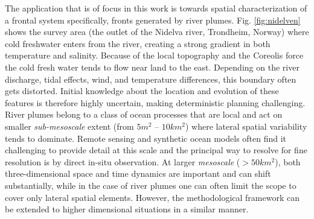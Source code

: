 \documentclass[aoas]{imsart}
\begin{document}
The application that is of focus in this work is towards spatial characterization of a frontal system specifically, fronts generated by river
plumes. Fig. \ref{fig:nidelven} shows the survey area (the outlet of
the Nidelva river, Trondheim, Norway) where cold freshwater enters
from the river, creating a strong gradient in both temperature and
salinity. Because of the local topography and the Coreolis force
\citep{coriolis1835memoire} the cold fresh water tends to flow near
land to the east. Depending on the river discharge, tidal effects,
wind, and temperature differences, this boundary often gets
distorted. Initial knowledge about the location and evolution of these
features is therefore highly uncertain, making deterministic planning
challenging. River plumes belong to a class of ocean processes that are local and
act on smaller \emph{sub-mesoscale} extent (from $5 m^2$ -- $10 km^2$) where
lateral spatial variability tends to dominate. Remote sensing and
synthetic ocean models often find it challenging to provide detail at
this scale \citep{Lermusiaux:2006} and the principal way to resolve
for fine resolution is by direct in-situ observation. At larger
\emph{mesoscale} ($>50 km^2$), both three-dimensional space and time
dynamics are important and can shift substantially, while in the case
of river plumes one can often limit the scope to cover only lateral
spatial elements. However, the methodological framework can be
extended to higher dimensional situations in a similar manner.


\end{document}
